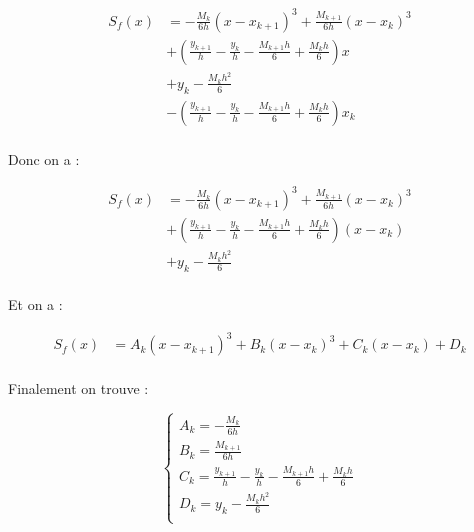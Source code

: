 \documentclass{article}
\begin{document}
\begin{enumerate}
\begin{enumerate}
    \begin{equation*}
      \begin{split}
        S_f(x) & = - \frac{M_k}{6h} (x - x_{k + 1})^3 + 
        \frac{M_{k + 1}}{6h} (x - x_k)^3 \\
        & + \left( \frac{y_{k + 1}}{h} - \frac{y_k}{h} - \frac{M_{k
            + 1} h}{6} + \frac{M_k h}{6} \right) x \\
        & + y_k - \frac{M_k h^2}{6} \\
        & - \left( \frac{y_{k + 1}}{h} - \frac{y_k}{h} - \frac{M_{k
            + 1} h}{6} + \frac{M_k h}{6} \right) x_k\\
      \end{split}
    \end{equation*}

    Donc on a :

    \begin{equation*}
      \begin{split}
        S_f(x) & = - \frac{M_k}{6h} (x - x_{k + 1})^3 + 
        \frac{M_{k + 1}}{6h} (x - x_k)^3 \\
        & + \left( \frac{y_{k + 1}}{h} - \frac{y_k}{h} - \frac{M_{k
            + 1} h}{6} + \frac{M_k h}{6} \right) (x - x_k) \\
        & + y_k - \frac{M_k h^2}{6} \\
      \end{split}
    \end{equation*}

    Et on a :
    
    \begin{equation*}
      \begin{split}
        S_f(x) & = A_k (x - x_{k + 1})^3 + B_k (x - x_k)^3 + C_k (x -
        x_k) + D_k \\
      \end{split}
    \end{equation*}

    Finalement on trouve :

    \begin{equation*}
      \left\{
      \begin{array}{l}
        A_k = - \frac{M_k}{6h}\\
        B_k = \frac{M_{k + 1}}{6h}\\
        C_k = \frac{y_{k + 1}}{h} - \frac{y_k}{h} - \frac{M_{k
            + 1} h}{6} + \frac{M_k h}{6}\\
        D_k = y_k - \frac{M_k h^2}{6}\\
      \end{array}
      \right.
    \end{equation*}



\end{enumerate}
\end{enumerate}
\end{document}
